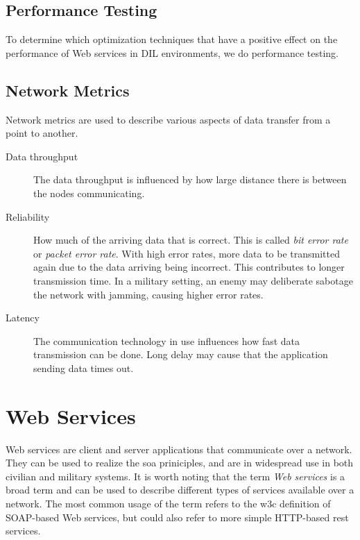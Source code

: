 \subsection{Performance Testing}

To determine which optimization techniques that have a positive effect on the
performance of Web services in DIL environments, we do performance testing.

\subsection{Network Metrics}

Network metrics are used to describe various aspects of data transfer from a
point to another.

\begin{description}

\item[Data throughput] The data throughput is influenced by how large distance
there is between the nodes communicating.

\item[Reliability] How much of the arriving data that is correct. This is
called \textit{bit error rate} or \textit{packet error rate}. With high error
rates, more data to be transmitted again due to the data arriving being
incorrect. This contributes to longer transmission time. In a military setting,
an enemy may deliberate sabotage the network with jamming, causing higher error
rates.

\item[Latency] The communication technology in use influences how fast data
transmission can be done. Long delay may cause that the application sending data
times out.

\end{description}


\section{Web Services}
\label{web-services}

Web services are client and server applications that communicate over a network.
They can be used to realize the \gls{soa} priniciples, and are in widespread use
in both civilian and military systems. It is worth noting that the term \textit{Web
services} is a broad term and can be used to describe different types of
services available over a network. The most common usage of the term refers to
the \gls{w3c} definition of SOAP-based Web services, but could also refer to
more simple HTTP-based \gls{rest} services.

